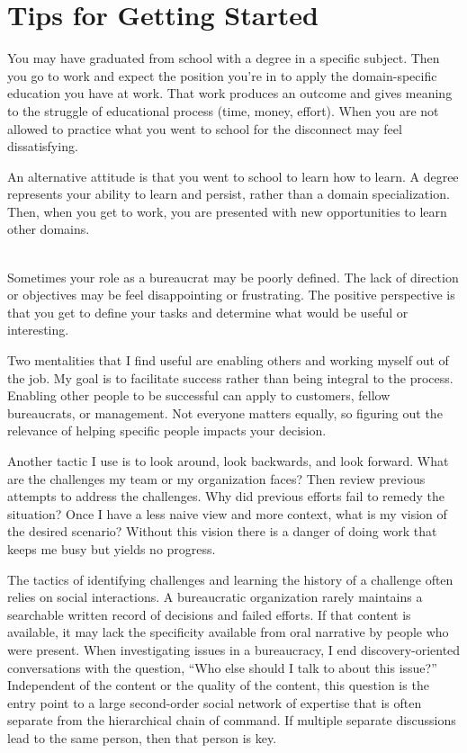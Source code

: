 \section{Tips for Getting Started}

You may have graduated from school with a degree in a specific subject. Then you go to work and expect the position you're in to apply the domain-specific education you have at work. That work produces an outcome and gives meaning to the struggle of educational process (time, money, effort). When you are not allowed to practice what you went to school for the disconnect may feel dissatisfying.

An alternative attitude is that you went to school to learn how to learn. A degree represents your ability to learn and persist, rather than a domain specialization. Then, when you get to work, you are presented with new opportunities to learn other domains. 

\ \\

Sometimes your role as a bureaucrat may be poorly defined. The lack of direction or objectives may be feel disappointing or frustrating. The positive perspective is that you get to define your tasks and determine what would be useful or interesting. 

Two mentalities that I find useful are enabling others and working myself out of the job. My goal is to facilitate success rather than being integral to the process. Enabling other people to be successful can apply to customers, fellow bureaucrats, or management. Not everyone matters equally, so figuring out the relevance of helping specific people impacts your decision. 

Another tactic I use is to look around, look backwards, and look forward. What are the challenges my team or my organization faces? Then review previous attempts to address the challenges. Why did previous efforts fail to remedy the situation? Once I have a less naive view and more context, what is my vision of the desired scenario? Without this vision there is a danger of doing work that keeps me busy but yields no progress. 

The tactics of identifying challenges and learning the history of a challenge often relies on social interactions. A bureaucratic organization rarely maintains a searchable written record of decisions and failed efforts. If that content is available, it may lack the specificity available from oral narrative by people who were present. When investigating issues in a bureaucracy, I end discovery-oriented conversations with the question, ``Who else should I talk to about this issue?'' Independent of the content or the quality of the content, this question is the entry point to a large second-order social network of expertise that is often separate from the hierarchical chain of command. If multiple separate discussions lead to the same person, then that person is key. 

